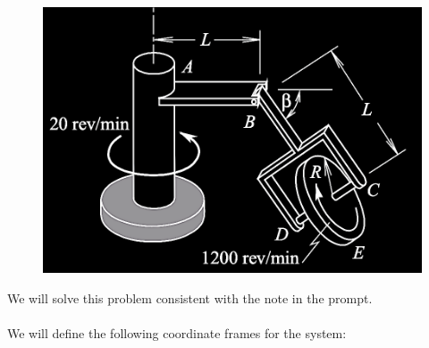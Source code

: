 \documentclass[12pt, letterpaper]{../assignment}
\begin{document}
\begin{figure}[H]
    \centering
    \includegraphics[scale=0.5,frame]{images/Problem_2.png}
\end{figure}

We will solve this problem consistent with the note in the prompt.
\\\\
We will define the following coordinate frames for the system:
\end{document}

